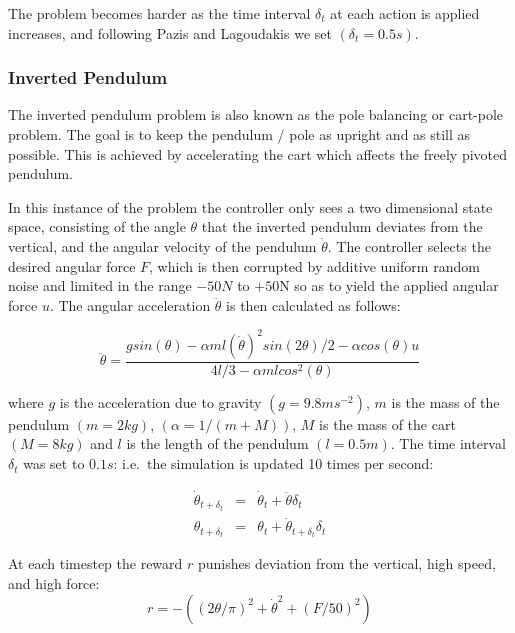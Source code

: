 \documentclass[conference]{IEEEtran}
\begin{document}
The problem becomes harder as the time interval $\delta_t$ at %
each action is applied increases,
and following Pazis and Lagoudakis we set $(\delta_t = 0.5s)$.


\subsubsection{Inverted Pendulum}

The inverted pendulum problem is also known as the pole balancing
or cart-pole problem.  The goal is to keep the pendulum / pole as upright and as still as possible.
This is achieved by accelerating the cart which affects the freely pivoted pendulum.

In this instance of the problem the controller only sees a two dimensional
state space, consisting of the
angle $\theta$ that the inverted pendulum deviates from the vertical, and the angular velocity
of the pendulum $\dot{\theta}$.
The controller selects the desired angular force $F$,
which is then corrupted by additive uniform random noise and limited in the range $-50N$ to $+50$N
so as to yield the applied angular force $u$.  The angular acceleration $\ddot{\theta}$ is then calculated
as follows:

\begin{equation}
\ddot{\theta} = \frac{g sin(\theta) - \alpha m l (\dot{\theta})^2 sin(2 \theta) / 2 - \alpha cos(\theta) u}
                     {4l/3 - \alpha m l  cos^2(\theta)}
\end{equation}

where $g$ is the acceleration due to gravity
$(g = 9.8ms^{-2})$,
$m$ is the mass of the pendulum
$(m = 2kg)$, $(\alpha = 1 / (m + M))$, $M$ is the mass of the cart
$(M = 8kg)$ and $l$ is the length of the pendulum $(l = 0.5m)$.
The time interval $\delta_t$ was set to $0.1s$: i.e.\ the simulation is
updated 10 times per second:

\begin{eqnarray}
\dot{\theta}_{t+\delta_t} & = &  \dot{\theta}_{t} + \ddot{\theta} \delta_t \\
\theta_{t+\delta_t}  & = & \theta_{t} + \dot{\theta}_{t+\delta_t} \delta_t
\end{eqnarray}

At each timestep the reward $r$ punishes deviation from the vertical, high speed, and high force:
\begin{equation}
r = -((2 \theta / \pi)^2 + \dot{\theta}^2 + (F / 50)^2 )
\label{eq:rew:t}
\end{equation}
\end{document}
